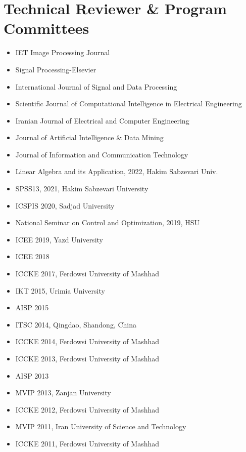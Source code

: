 \documentclass[10pt,a4paper]{moderncv}
\begin{document}
\section{Technical Reviewer \& Program Committees}

\begin{itemize}
\item IET Image Processing Journal
\item Signal Processing-Elsevier
\item International Journal of Signal and Data Processing
\item  Scientific Journal of Computational Intelligence in Electrical Engineering
\item Iranian Journal of Electrical and Computer Engineering
\item Journal of Artificial Intelligence \& Data Mining
\item Journal of Information and Communication Technology 

\item Linear Algebra and its Application, 2022, Hakim Sabzevari Univ.
\item SPSS13, 2021, Hakim Sabzevari University
\item ICSPIS 2020, Sadjad University
\item National Seminar on Control and Optimization, 2019, HSU
\item ICEE 2019, Yazd University
\item ICEE 2018
\item ICCKE 2017, Ferdowsi University of Mashhad
\item IKT 2015, Urimia University
\item AISP 2015
\item ITSC 2014, Qingdao, Shandong, China
\item ICCKE 2014, Ferdowsi University of Mashhad
\item ICCKE 2013, Ferdowsi University of Mashhad
\item AISP 2013
\item MVIP 2013, Zanjan University
\item ICCKE 2012, Ferdowsi University of Mashhad
\item MVIP 2011, Iran University of Science and Technology
\item ICCKE 2011, Ferdowsi University of Mashhad
\end{itemize}

\end{document}
